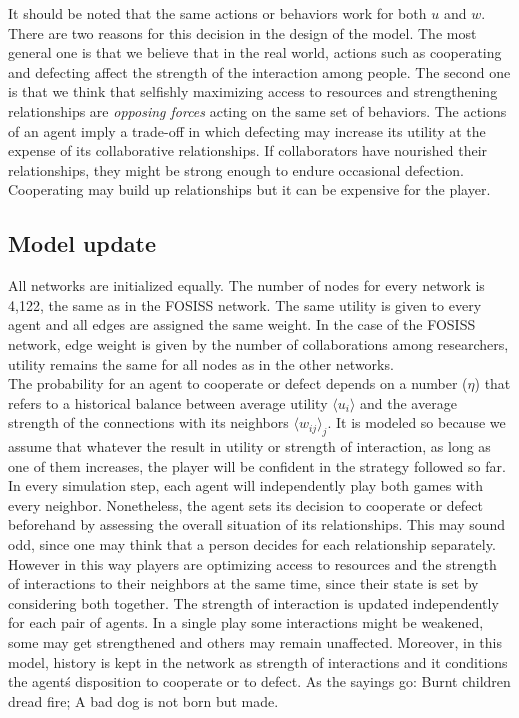 \documentclass{bmcart}
\begin{document}
It should be noted that the same actions or behaviors work for both
$u$ and $w$. There are two reasons for this decision in the design of
the model. The most general one is that we believe that in the real
world, actions such as cooperating and defecting affect the strength
of the interaction among people. The second one is that we think that
selfishly maximizing access to resources and strengthening
relationships are \emph{opposing forces} acting on the same set of
behaviors. The actions of an agent imply a trade-off in which
defecting may increase its utility at the expense of its collaborative
relationships. If collaborators have nourished their relationships,
they might be strong enough to endure occasional
defection. Cooperating may build up relationships but it can be
expensive for the player.

\subsection*{Model update}

All networks are initialized equally. The number of nodes for every
network is 4,122, the same as in the FOSISS network.  The same utility
is given to every agent and all edges are assigned the same weight. In
the case of the FOSISS network, edge weight is given by the number of
collaborations among researchers, utility remains the same for all
nodes as in the other networks.\\

The probability for an agent to cooperate or defect depends on a number ($\eta$)
that refers to a historical balance between average utility $\langle u_i \rangle$ and the average
strength of the connections with its neighbors $\langle w_{ij} \rangle _j$. It is modeled so because we
assume that whatever the result in utility or strength of interaction, as long
as one of them increases, the player will be confident in the strategy followed
so far. {\color{red}In every simulation step, each agent will independently play both games
with every neighbor. Nonetheless, the agent sets its decision to cooperate or
defect beforehand by assessing the overall situation of its relationships. This
may sound odd, since one may think that a person decides for each relationship
separately. However in this way players are optimizing access to resources and
the strength of interactions to their neighbors at the same time, since their
state is set by considering both together. The strength of interaction is
updated independently for each pair of agents.  In a single play some
interactions might be weakened, some may get strengthened and others may remain
unaffected. Moreover, in this model, history is kept in the network as strength
of interactions and it conditions the agent\'s disposition to cooperate or to
defect. As the sayings go: Burnt children dread fire; A bad dog is not born but made.}\\
\end{document}
